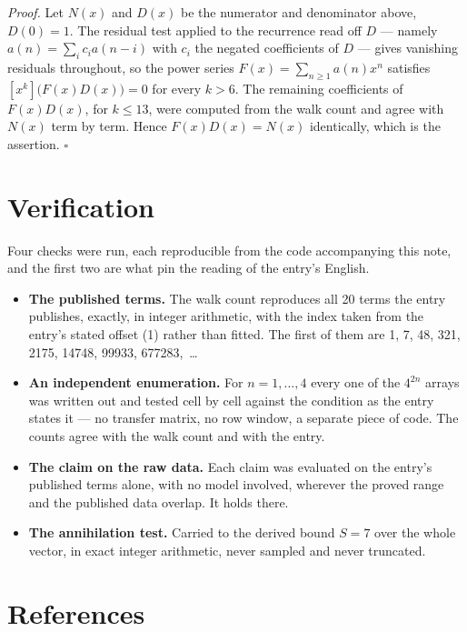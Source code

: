 \documentclass[11pt]{article}
\theoremstyle{definition}
\begin{document}
{\itshape Proof.} Let $N(x)$ and $D(x)$ be the numerator and denominator above, $D(0)=1$. The residual test applied to the recurrence read off $D$ --- namely $a(n) = \sum_i c_i a(n-i)$ with $c_i$ the negated coefficients of $D$ --- gives vanishing residuals throughout, so the power series $F(x)=\sum_{n\ge 1}a(n)x^n$ satisfies $[x^k]\bigl(F(x)D(x)\bigr) = 0$ for every $k > 6$. The remaining coefficients of $F(x)D(x)$, for $k \le 13$, were computed from the walk count and agree with $N(x)$ term by term. Hence $F(x)D(x) = N(x)$ identically, which is the assertion. $\square$

\section{Verification}

Four checks were run, each reproducible from the code accompanying this note, and the first two are what pin the reading of the entry's English.

\begin{itemize}

\item {\bfseries The published terms.} The walk count reproduces all 20 terms the entry publishes, exactly, in integer arithmetic, with the index taken from the entry's stated offset (1) rather than fitted. The first of them are 1, 7, 48, 321, 2175, 14748, 99933, 677283,~\dots

\item {\bfseries An independent enumeration.} For $n = 1,\dots,4$ every one of the $4^{2n}$ arrays was written out and tested cell by cell against the condition as the entry states it --- no transfer matrix, no row window, a separate piece of code. The counts agree with the walk count and with the entry.

\item {\bfseries The claim on the raw data.} Each claim was evaluated on the entry's published terms alone, with no model involved, wherever the proved range and the published data overlap. It holds there.

\item {\bfseries The annihilation test.} Carried to the derived bound $S = 7$ over the whole vector, in exact integer arithmetic, never sampled and never truncated.

\end{itemize}

\section{References}
\end{document}
